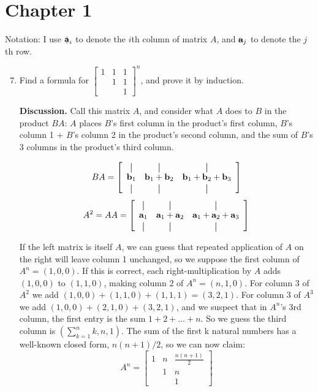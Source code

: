 \documentclass[main.tex]{subfiles}
\begin{document}
\section*{Chapter 1}
Notation: I use $\colvec{a}_i$ to denote the $i$th column of matrix $A$, and $\rowvec{a}_j$ to denote the $j$th row.


\begin{enumerate}[label=1.\arabic*]
\setcounter{enumi}{6}
\item Find a formula for $\begin{bmatrix}
    1 & 1 & 1 \\ & 1 & 1 \\ & & 1
  \end{bmatrix}^n$, and prove it by induction.

\textbf{Discussion.} Call this matrix $A$, and consider what $A$ does to $B$ in the product $BA$: $A$ places $B$'s first column in the product's first column, $B$'s column 1 + $B$'s column 2 in the product's second column, and the sum of $B$'s 3 columns in the product's third column.

\[
  BA=
  \left[
    \begin{array}{ccc}
      \vertbar       & \vertbar                      & \vertbar                                   \\
      \mathbf{b}_{1} & \mathbf{b}_1 + \mathbf{b}_{2} & \mathbf{b}_1 + \mathbf{b}_2 + \mathbf{b}_3 \\
      \vertbar       & \vertbar                      & \vertbar
    \end{array}
    \right]
\]
\[
  A^2 = AA=
  \left[
    \begin{array}{ccc}
      \vertbar       & \vertbar                      & \vertbar                                   \\
      \mathbf{a}_{1} & \mathbf{a}_1 + \mathbf{a}_{2} & \mathbf{a}_1 + \mathbf{a}_2 + \mathbf{a}_3 \\
      \vertbar       & \vertbar                      & \vertbar
    \end{array}
    \right]
\]

If the left matrix is itself $A$, we can guess that repeated application of $A$ on the right will leave column 1 unchanged, so we suppose the first column of $A^n = (1, 0, 0)$. If this is correct, each right-multiplication by $A$ adds $(1, 0, 0)$ to $(1, 1, 0)$, making column 2 of $A^n = (n, 1, 0)$. For column 3 of $A^2$ we add $(1, 0, 0) + (1, 1, 0)  + (1, 1, 1) = (3, 2, 1)$. For column 3 of $A^3$ we add $(1, 0, 0) + (2, 1, 0) + (3, 2, 1)$, and we suspect that in $A^n$'s 3rd column, the first entry is the sum $1 + 2 + \ldots + n$. So we guess the third column is $(\sum_{k=1}^n k , n , 1)$. The sum of the first k natural numbers has a well-known closed
form, $n(n+1)/2$, so we can now claim:
$$A^n = \begin{bmatrix} 1 & n & \frac{n(n+1)}{2} \\ & 1 & n \\ & & 1 \end{bmatrix}$$


\end{enumerate}
\end{document}
